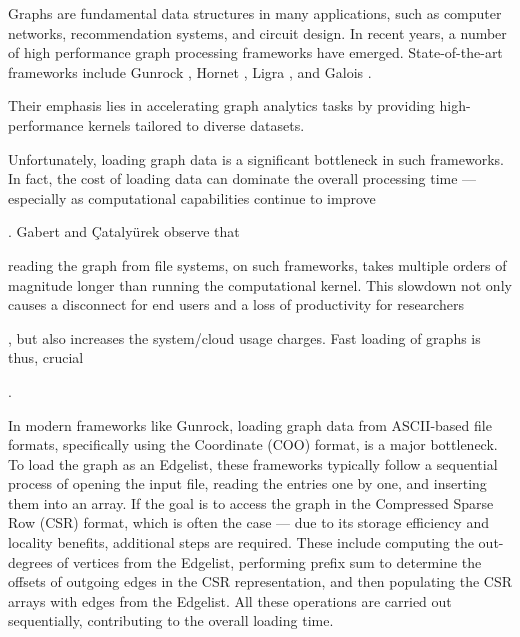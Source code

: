 Graphs are fundamental data structures in many applications, such as computer networks, recommendation systems, and circuit design. In recent years, a number of high performance graph processing frameworks have emerged. State-of-the-art frameworks include Gunrock \cite{wang2016gunrock}, Hornet \cite{busato2018hornet}, Ligra \cite{shun2013ligra}, and Galois \cite{nguyen2013lightweight}. Their emphasis lies in accelerating graph analytics tasks by providing high-performance kernels tailored to diverse datasets.

Unfortunately, loading graph data is a significant bottleneck in such frameworks. In fact, the cost of loading data can dominate the overall processing time --- especially as computational capabilities continue to improve. Gabert and Çatalyürek \cite{gabert2021pigo} observe that reading the graph from file systems, on such frameworks, takes multiple orders of magnitude longer than running the computational kernel. This slowdown not only causes a disconnect for end users and a loss of productivity for researchers, but also increases the system/cloud usage charges. Fast loading of graphs is thus, crucial.

In modern frameworks like Gunrock, loading graph data from ASCII-based file formats, specifically using the Coordinate (COO) format, is a major bottleneck. To load the graph as an Edgelist, these frameworks typically follow a sequential process of opening the input file, reading the entries one by one, and inserting them into an array. If the goal is to access the graph in the Compressed Sparse Row (CSR) format, which is often the case --- due to its storage efficiency and locality benefits, additional steps are required. These include computing the out-degrees of vertices from the Edgelist, performing prefix sum to determine the offsets of outgoing edges in the CSR representation, and then populating the CSR arrays with edges from the Edgelist. All these operations are carried out sequentially, contributing to the overall loading time.


